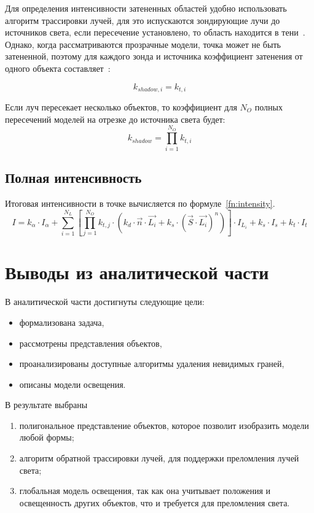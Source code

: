 Для определения интенсивности затененных областей удобно использовать алгоритм трассировки лучей, для это испускаются зондирующие лучи до источников света, если пересечение установлено, то область находится в тени~\cite[с.~517]{rogers-book}. Однако, когда рассматриваются прозрачные модели, точка может не быть затененной, поэтому для каждого зонда и источника коэффициент затенения от одного объекта составляет~\cite[с.~368]{cg-priciples}:

\begin{equation}
	k_{shadow,i} = k_{t, i}
\end{equation} 

Если луч пересекает несколько объектов, то коэффициент для $N_O$ полных пересечений моделей на отрезке до источника света будет:
\begin{equation}
	k_{shadow} = \prod_{i=1}^{N_O} k_{t, i}
\end{equation}

\subsection{Полная интенсивность}

Итоговая интенсивности в точке вычисляется по формуле~\ref{fn:intensity}.
\begin{equation} \label{fn:intensity}
		I = k_{\alpha} \cdot I_{\alpha} + 
		\sum_{i=1}^{N_L} \left[
			\prod_{j=1}^{N_O}	k_{t, j} \cdot 
			(k_d \cdot \vec{n} \cdot \vec{L_i} + k_s \cdot (\vec{S} \cdot \vec{L_i}) ^ n) 
		\right] \cdot I_{L_i} + 
		k_s \cdot I_s + 
		k_t \cdot I_t
\end{equation}

\section{Выводы из аналитической части}
В аналитической части достигнуты следующие цели:
\begin{itemize}
	\item формализована задача,
	\item рассмотрены представления объектов,
	\item проанализированы доступные алгоритмы удаления невидимых граней,
	\item описаны модели освещения.
\end{itemize}

В результате выбраны
\begin{enumerate}
	\item полигональное представление объектов, которое позволит изобразить модели любой формы;
	\item алгоритм обратной трассировки лучей, для поддержки преломления лучей света;
	\item глобальная модель освещения, так как она учитывает положения и освещенность других объектов, что и требуется для преломления света.
\end{enumerate}




\clearpage

